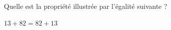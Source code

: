 %
%
    Quelle est la propriété illustrée par l'égalité suivante ?

    \hfil \(13+82 = 82 + 13\) \hfil {}
